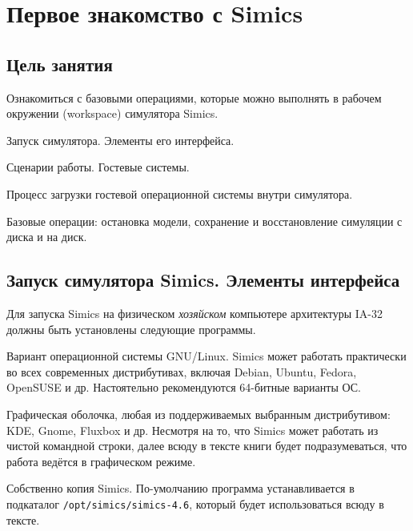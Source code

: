 \chapter{Первое знакомство с Simics}\label{chap:lab01}

\section{Цель занятия}

Ознакомиться с базовыми операциями, которые можно выполнять в рабочем окружении (\abbr workspace) симулятора Simics.

\begin{itemize*}
    \item Запуск симулятора. Элементы его интерфейса.
    \item Сценарии работы. Гостевые системы. 
    \item Процесс загрузки гостевой операционной системы внутри симулятора.
    \item Базовые операции: остановка модели, сохранение и восстановление симуляции с диска и на диск.
\end{itemize*}

\section{Запуск симулятора Simics. Элементы интерфейса}


Для запуска Simics на физическом \textit{хозяйском} компьютере архитектуры IA-32 должны быть установлены следующие программы.

\begin{itemize*}
\item Вариант операционной системы GNU/Linux. Simics может работать практически во всех современных дистрибутивах, включая Debian, Ubuntu, Fedora, OpenSUSE и др. Настоятельно рекомендуются 64-битные варианты ОС.
\item Графическая оболочка, любая из поддерживаемых выбранным дистрибутивом: KDE, Gnome, Fluxbox и др. Несмотря на то, что Simics может работать из чистой командной строки, далее всюду в тексте книги будет подразумеваться, что работа ведётся в графическом режиме.
\item Собственно копия Simics. По-умолчанию программа устанавливается в подкаталог \texttt{/opt/simics/simics-4.6}, который будет использоваться всюду в тексте.
\end{itemize*}

